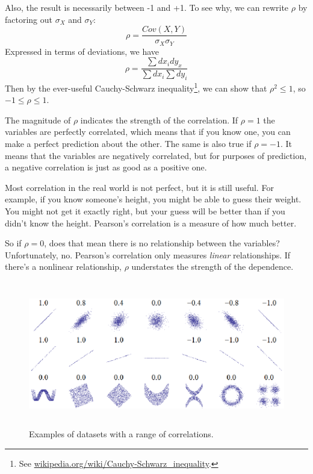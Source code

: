 \documentclass[12pt]{book}
\begin{document}

Also, the result is necessarily between -1 and +1.  To see why, we
can rewrite $\rho$ by factoring out $\sigma_X$ and $\sigma_Y$:
%
\[ \rho = \frac{Cov(X,Y)}{\sigma_X \sigma_Y} \]
%
Expressed in terms of deviations, we have
%
\[ \rho = \frac{\sum dx_i dy_x}{\sum dx_i \sum dy_i} \]
%
Then by the ever-useful Cauchy-Schwarz inequality\footnote{See
  \url{wikipedia.org/wiki/Cauchy-Schwarz_inequality}.}, we can show
that $\rho^2 \le 1$, so $-1 \le \rho \le 1$.


The magnitude of $\rho$ indicates the strength of the correlation.  If
$\rho=1$ the variables are perfectly correlated, which means that if
you know one, you can make a perfect prediction about the other.  The
same is also true if $\rho=-1$.  It means that the variables
are negatively correlated, but for purposes of prediction, a
negative correlation is just as good as a positive one.


Most correlation in the real world is not perfect, but it
is still useful.  For example, if you know someone's height, you might
be able to guess their weight.  You might not get it exactly right, but
your guess will be better than if you didn't know the height.
Pearson's correlation is a measure of how much better.

So if $\rho=0$, does that mean there is no
relationship between the variables?  Unfortunately, no.  Pearson's
correlation only measures {\em linear} relationships.  If there's a
nonlinear relationship, $\rho$ understates the strength of the
dependence.


\begin{figure}
\centerline{\includegraphics[height=2.5in]{figs/Correlation_examples.eps}}
\caption{Examples of datasets with a range of correlations.}
\label{corr_examples}
\end{figure}
\end{document}
